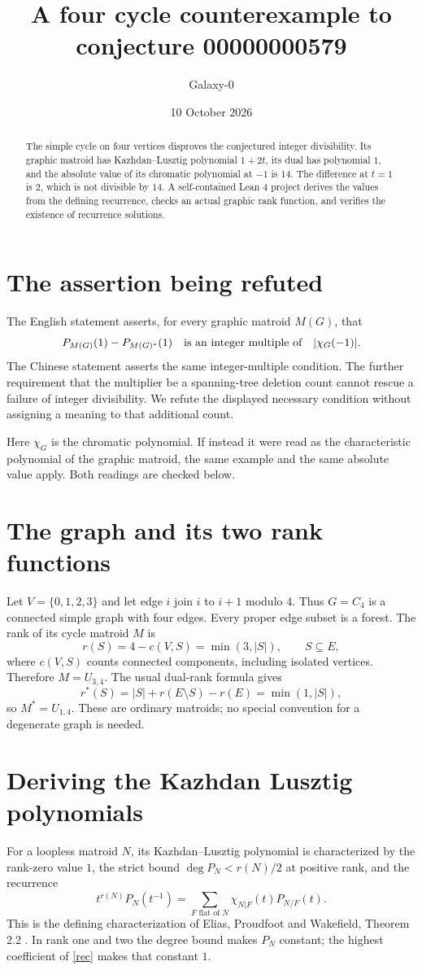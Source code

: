 \documentclass[11pt]{article}
\title{A four cycle counterexample to conjecture 00000000579}
\author{Galaxy-0}
\date{10 October 2026}
\begin{document}
\sloppy
\maketitle
\begin{abstract}
The simple cycle on four vertices disproves the conjectured integer divisibility. Its graphic matroid has Kazhdan--Lusztig polynomial $1+2t$, its dual has polynomial $1$, and the absolute value of its chromatic polynomial at $-1$ is $14$. The difference at $t=1$ is $2$, which is not divisible by $14$. A self-contained Lean 4 project derives the values from the defining recurrence, checks an actual graphic rank function, and verifies the existence of recurrence solutions.
\end{abstract}

\section{The assertion being refuted}
The English statement asserts, for every graphic matroid $M(G)$, that
\[
 P_{M(G)}(1)-P_{M(G)^*}(1)
 \quad\hbox{is an integer multiple of}\quad |\chi_G(-1)|.
\]
The Chinese statement asserts the same integer-multiple condition. The further requirement that the multiplier be a spanning-tree deletion count cannot rescue a failure of integer divisibility. We refute the displayed necessary condition without assigning a meaning to that additional count.

Here $\chi_G$ is the chromatic polynomial. If instead it were read as the characteristic polynomial of the graphic matroid, the same example and the same absolute value apply. Both readings are checked below.

\section{The graph and its two rank functions}
Let $V=\{0,1,2,3\}$ and let edge $i$ join $i$ to $i+1$ modulo $4$. Thus $G=C_4$ is a connected simple graph with four edges. Every proper edge subset is a forest. The rank of its cycle matroid $M$ is
\[
 r(S)=4-c(V,S)=\min(3,|S|),\qquad S\subseteq E,
\]
where $c(V,S)$ counts connected components, including isolated vertices. Therefore $M=U_{3,4}$. The usual dual-rank formula gives
\[
 r^*(S)=|S|+r(E\setminus S)-r(E)=\min(1,|S|),
\]
so $M^*=U_{1,4}$. These are ordinary matroids; no special convention for a degenerate graph is needed.

\section{Deriving the Kazhdan Lusztig polynomials}
For a loopless matroid $N$, its Kazhdan--Lusztig polynomial is characterized by the rank-zero value $1$, the strict bound $\deg P_N<r(N)/2$ at positive rank, and the recurrence
\begin{equation}\label{rec}
 t^{r(N)}P_N(t^{-1})=\sum_{F\text{ flat of }N}\chi_{N|F}(t)P_{N/F}(t).
\end{equation}
This is the defining characterization of Elias, Proudfoot and Wakefield, Theorem 2.2 \cite{epw}. In rank one and two the degree bound makes $P_N$ constant; the highest coefficient of \eqref{rec} makes that constant $1$.
\end{document}
